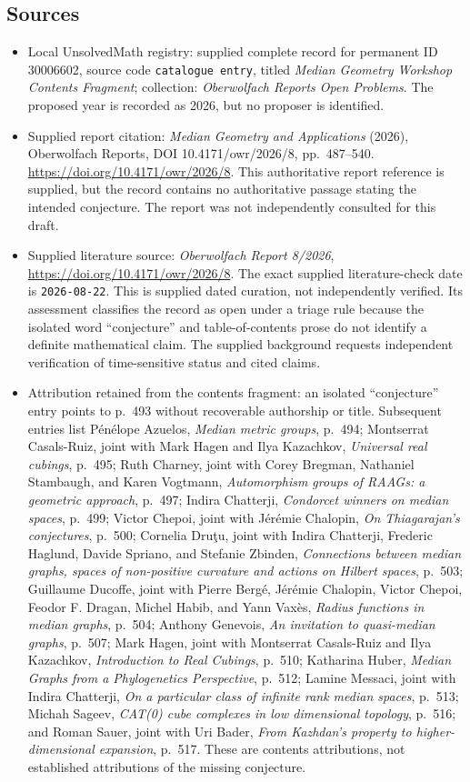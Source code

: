 \documentclass[11pt]{article}
\begin{document}
\subsection{Sources}
\begin{itemize}
\item Local UnsolvedMath registry: supplied complete record for permanent ID 30006602, source code \texttt{catalogue entry}, titled \emph{Median Geometry Workshop Contents Fragment}; collection: \emph{Oberwolfach Reports Open Problems}. The proposed year is recorded as 2026, but no proposer is identified.
\item Supplied report citation: \emph{Median Geometry and Applications} (2026), Oberwolfach Reports, DOI 10.4171/owr/2026/8, pp.\ 487--540. \url{https://doi.org/10.4171/owr/2026/8}. This authoritative report reference is supplied, but the record contains no authoritative passage stating the intended conjecture. The report was not independently consulted for this draft.
\item Supplied literature source: \emph{Oberwolfach Report 8/2026}, \url{https://doi.org/10.4171/owr/2026/8}. The exact supplied literature-check date is \texttt{2026-08-22}. This is supplied dated curation, not independently verified. Its assessment classifies the record as open under a triage rule because the isolated word ``conjecture'' and table-of-contents prose do not identify a definite mathematical claim. The supplied background requests independent verification of time-sensitive status and cited claims.
\item Attribution retained from the contents fragment: an isolated ``conjecture'' entry points to p.\ 493 without recoverable authorship or title. Subsequent entries list Pénélope Azuelos, \emph{Median metric groups}, p.\ 494; Montserrat Casals-Ruiz, joint with Mark Hagen and Ilya Kazachkov, \emph{Universal real cubings}, p.\ 495; Ruth Charney, joint with Corey Bregman, Nathaniel Stambaugh, and Karen Vogtmann, \emph{Automorphism groups of RAAGs: a geometric approach}, p.\ 497; Indira Chatterji, \emph{Condorcet winners on median spaces}, p.\ 499; Victor Chepoi, joint with Jérémie Chalopin, \emph{On Thiagarajan's conjectures}, p.\ 500; Cornelia Druţu, joint with Indira Chatterji, Frederic Haglund, Davide Spriano, and Stefanie Zbinden, \emph{Connections between median graphs, spaces of non-positive curvature and actions on Hilbert spaces}, p.\ 503; Guillaume Ducoffe, joint with Pierre Bergé, Jérémie Chalopin, Victor Chepoi, Feodor F. Dragan, Michel Habib, and Yann Vaxès, \emph{Radius functions in median graphs}, p.\ 504; Anthony Genevois, \emph{An invitation to quasi-median graphs}, p.\ 507; Mark Hagen, joint with Montserrat Casals-Ruiz and Ilya Kazachkov, \emph{Introduction to Real Cubings}, p.\ 510; Katharina Huber, \emph{Median Graphs from a Phylogenetics Perspective}, p.\ 512; Lamine Messaci, joint with Indira Chatterji, \emph{On a particular class of infinite rank median spaces}, p.\ 513; Michah Sageev, \emph{CAT(0) cube complexes in low dimensional topology}, p.\ 516; and Roman Sauer, joint with Uri Bader, \emph{From Kazhdan's property to higher-dimensional expansion}, p.\ 517. These are contents attributions, not established attributions of the missing conjecture.
\end{itemize}
\end{document}
